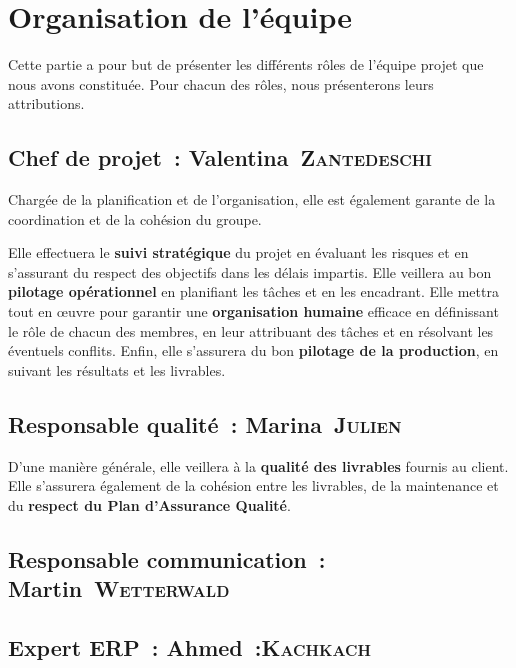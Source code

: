 \chapter{Organisation de l'équipe}
Cette partie a pour but de présenter les différents rôles de l'équipe projet que nous avons constituée. Pour chacun des rôles, nous présenterons leurs attributions.

\section{Chef de projet~: Valentina~\textsc{Zantedeschi}}
Chargée de la planification et de l'organisation, elle est également garante de la coordination et de la cohésion du groupe.

Elle effectuera le \textbf{suivi stratégique} du projet en évaluant les risques et en s'assurant du respect des objectifs dans les délais impartis. Elle veillera au bon \textbf{pilotage opérationnel} en planifiant les tâches et en les encadrant. Elle mettra tout en œuvre pour garantir une \textbf{organisation humaine} efficace en définissant le rôle de chacun des membres, en leur attribuant des tâches et en résolvant les éventuels conflits. Enfin, elle s'assurera du bon \textbf{pilotage de la production}, en suivant les résultats et les livrables.


\section{Responsable qualité~: Marina~\textsc{Julien}}
D'une manière générale, elle veillera à la \textbf{qualité des livrables} fournis au client. Elle s'assurera également de la cohésion entre les livrables, de la maintenance et du \textbf{respect du Plan d'Assurance Qualité}.

\section{Responsable communication~: Martin~\textsc{Wetterwald}}

\section{Expert ERP~: Ahmed~:\textsc{Kachkach}}
